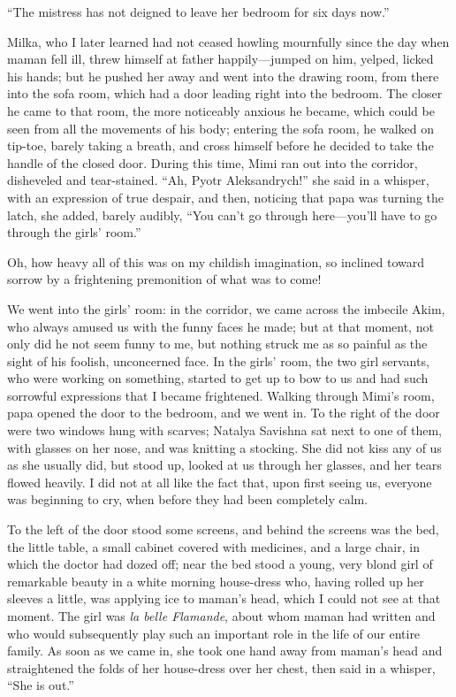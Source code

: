 ``The mistress has not deigned to leave her bedroom for six days now.'' %

Milka, who I later learned had not ceased howling mournfully since the day when maman fell ill, threw himself at father happily---jumped on him, yelped, licked his hands; but he pushed her away and went into the drawing room, from there into the sofa room, which had a door leading right into the bedroom. The closer he came to that room, the more noticeably anxious he became, which could be seen from all the movements of his body; entering the sofa room, he walked on tip-toe, barely taking a breath, and cross himself before he decided to take the handle of the closed door. During this time, Mimi ran out into the corridor, disheveled and tear-stained. ``Ah, Pyotr Aleksandrych!'' she said in a whisper, with an expression of true despair, and then, noticing that papa was turning the latch, she added, barely audibly, ``You can't go through here---you'll have to go through the girls' room.'' %

Oh, how heavy all of this was on my childish imagination, so inclined toward sorrow by a frightening premonition of what was to come!

We went into the girls' room: in the corridor, we came across the imbecile Akim, who always amused us with the funny faces he made; but at that moment, not only did he not seem funny to me, but nothing struck me as so painful as the sight of his foolish, unconcerned face. In the girls' room, the two girl servants, who were working on something, started to get up to bow to us and had such sorrowful expressions that I became frightened. Walking through Mimi's room, papa opened the door to the bedroom, and we went in. To the right of the door were two windows hung with scarves; Natalya Savishna sat next to one of them, with glasses on her nose, and was knitting a stocking. She did not kiss any of us as she usually did, but stood up, looked at us through her glasses, and her tears flowed heavily. I did not at all like the fact that, upon first seeing us, everyone was beginning to cry, when before they had been completely calm.

To the left of the door stood some screens, and behind the screens was the bed, the little table, a small cabinet covered with medicines, and a large chair, in which the doctor had dozed off; near the bed stood a young, very blond girl of remarkable beauty in a white morning house-dress who, having rolled up her sleeves a little, was applying ice to maman's head, which I could not see at that moment. The girl was \textit{la belle Flamande}, about whom maman had written and who would subsequently play such an important role in the life of our entire family. As soon as we came in, she took one hand away from maman's head and straightened the folds of her house-dress over her chest, then said in a whisper, ``She is out.'' %

